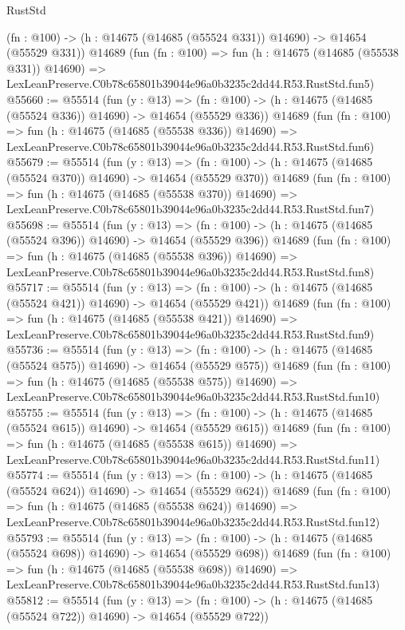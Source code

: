 \begin{lexlean}{RustStd}
\begin{coremodule}
    (fn : @100) -> (h : @14675 (@14685 (@55524 @331)) @14690) -> @14654 (@55529 @331))
    @14689
    (fun (fn : @100) =>
    fun (h : @14675 (@14685 (@55538 @331)) @14690) =>
    LexLeanPreserve.C0b78c65801b39044e96a0b3235c2dd44.R53.RustStd.fun5)
@55660 := @55514
    (fun (y : @13) =>
    (fn : @100) -> (h : @14675 (@14685 (@55524 @336)) @14690) -> @14654 (@55529 @336))
    @14689
    (fun (fn : @100) =>
    fun (h : @14675 (@14685 (@55538 @336)) @14690) =>
    LexLeanPreserve.C0b78c65801b39044e96a0b3235c2dd44.R53.RustStd.fun6)
@55679 := @55514
    (fun (y : @13) =>
    (fn : @100) -> (h : @14675 (@14685 (@55524 @370)) @14690) -> @14654 (@55529 @370))
    @14689
    (fun (fn : @100) =>
    fun (h : @14675 (@14685 (@55538 @370)) @14690) =>
    LexLeanPreserve.C0b78c65801b39044e96a0b3235c2dd44.R53.RustStd.fun7)
@55698 := @55514
    (fun (y : @13) =>
    (fn : @100) -> (h : @14675 (@14685 (@55524 @396)) @14690) -> @14654 (@55529 @396))
    @14689
    (fun (fn : @100) =>
    fun (h : @14675 (@14685 (@55538 @396)) @14690) =>
    LexLeanPreserve.C0b78c65801b39044e96a0b3235c2dd44.R53.RustStd.fun8)
@55717 := @55514
    (fun (y : @13) =>
    (fn : @100) -> (h : @14675 (@14685 (@55524 @421)) @14690) -> @14654 (@55529 @421))
    @14689
    (fun (fn : @100) =>
    fun (h : @14675 (@14685 (@55538 @421)) @14690) =>
    LexLeanPreserve.C0b78c65801b39044e96a0b3235c2dd44.R53.RustStd.fun9)
@55736 := @55514
    (fun (y : @13) =>
    (fn : @100) -> (h : @14675 (@14685 (@55524 @575)) @14690) -> @14654 (@55529 @575))
    @14689
    (fun (fn : @100) =>
    fun (h : @14675 (@14685 (@55538 @575)) @14690) =>
    LexLeanPreserve.C0b78c65801b39044e96a0b3235c2dd44.R53.RustStd.fun10)
@55755 := @55514
    (fun (y : @13) =>
    (fn : @100) -> (h : @14675 (@14685 (@55524 @615)) @14690) -> @14654 (@55529 @615))
    @14689
    (fun (fn : @100) =>
    fun (h : @14675 (@14685 (@55538 @615)) @14690) =>
    LexLeanPreserve.C0b78c65801b39044e96a0b3235c2dd44.R53.RustStd.fun11)
@55774 := @55514
    (fun (y : @13) =>
    (fn : @100) -> (h : @14675 (@14685 (@55524 @624)) @14690) -> @14654 (@55529 @624))
    @14689
    (fun (fn : @100) =>
    fun (h : @14675 (@14685 (@55538 @624)) @14690) =>
    LexLeanPreserve.C0b78c65801b39044e96a0b3235c2dd44.R53.RustStd.fun12)
@55793 := @55514
    (fun (y : @13) =>
    (fn : @100) -> (h : @14675 (@14685 (@55524 @698)) @14690) -> @14654 (@55529 @698))
    @14689
    (fun (fn : @100) =>
    fun (h : @14675 (@14685 (@55538 @698)) @14690) =>
    LexLeanPreserve.C0b78c65801b39044e96a0b3235c2dd44.R53.RustStd.fun13)
@55812 := @55514
    (fun (y : @13) =>
    (fn : @100) -> (h : @14675 (@14685 (@55524 @722)) @14690) -> @14654 (@55529 @722))

\end{coremodule}
\end{lexlean}
